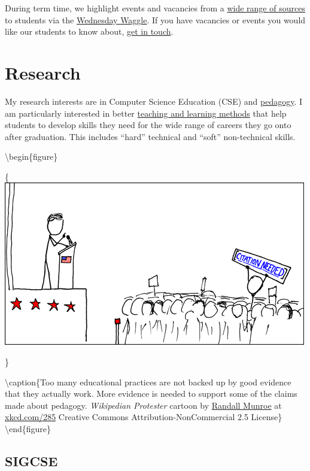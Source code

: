 \documentclass[12pt,]{book}
\begin{document}
During term time, we highlight events and vacancies from a \href{http://dullhunk.github.io/where-can-I-look-for-jobs.html}{wide range of sources} to students via the \href{https://waggle.cs.manchester.ac.uk/waggle/about}{Wednesday Waggle}. If you have vacancies or events you would like our students to know about, \protect\hyperlink{contact}{get in touch}.

\hypertarget{research}{%
\chapter{Research}\label{research}}

My research interests are in Computer Science Education (CSE) and \href{https://en.wikipedia.org/wiki/Pedagogy}{pedagogy}. I am particularly interested in better \href{https://www.manchester.ac.uk/study/undergraduate/teaching-learning/}{teaching and learning methods} that help students to develop skills they need for the wide range of careers they go onto after graduation. This includes ``hard'' technical and ``soft'' non-technical skills.

\textbackslash{}begin\{figure\}

\{\centering \includegraphics[width=0.7\linewidth]{images/wikipedian_protester}

\}

\textbackslash{}caption\{Too many educational practices are not backed up by good evidence that they actually work. More evidence is needed to support some of the claims made about pedagogy. \emph{Wikipedian Protester} cartoon by \href{https://en.wikipedia.org/wiki/Randall_Munroe}{Randall Munroe} at \href{https://xkcd.com/285/}{xkcd.com/285} Creative Commons Attribution-NonCommercial 2.5 License\}\label{fig:unnamed-chunk-4}
\textbackslash{}end\{figure\}

\hypertarget{sigcse}{%
\section{SIGCSE}\label{sigcse}}
\end{document}
